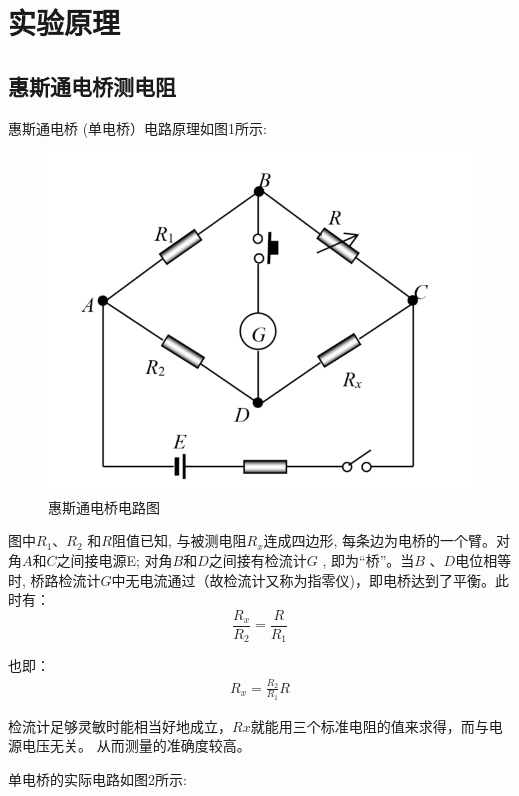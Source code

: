 \documentclass[UTF8]{ctexart}
\begin{document}
\section{实验原理}
    \subsection{惠斯通电桥测电阻} 
    惠斯通电桥 (单电桥）电路原理如图1所示:
    
    \begin{figure}[ht]
        \centering
        \includegraphics[scale=0.5]{惠斯通电桥.png}
        \caption{惠斯通电桥电路图}
        \label{fig:label}
    \end{figure}
    

    图中$R_{1}$、$R_{2}$ 和$R$阻值已知,
    与被测电阻$R_{x}$连成四边形, 每条边为电桥的一个臂。对角$A$和$C$之间接电源E;
    对角$B$和$D$之间接有检流计$G$ , 即为“桥”。当$B$ 、$D$电位相等时,
    桥路检流计$G$中无电流通过（故检流计又称为指零仪)，即电桥达到了平衡。此时有：
    $$
        \frac{R_{x}}{R_{2}}  = \frac{R}{R_{1}}
    $$

    也即：
    \begin{align}
        R_{x}=\frac{R_{2}}{R_{1}} R
    \end{align}

    检流计足够灵敏时能相当好地成立，$Rx$就能用三个标准电阻的值来求得，而与电源电压无关。
    从而测量的准确度较高。

    单电桥的实际电路如图2所示: 
\end{document}
